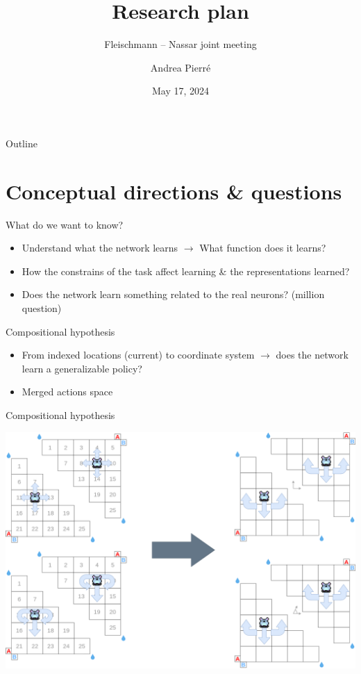 \documentclass[bigger]{beamer}
\author{Andrea Pierré}
\date{May 17, 2024}
\title{Research plan}
\subtitle{Fleischmann -- Nassar joint meeting}
\institute{Brown University}
\begin{document}
\maketitle
\begin{frame}[plain]{Outline}
\tableofcontents
\end{frame}

\section{Conceptual directions \& questions }
\label{sec:orga5c26cb}
\begin{frame}[<+->][label={sec:org422f1d5}]{What do we want to know?}
\begin{itemize}
\item Understand what the network learns
\(\to\) What \alert{function} does it learns?
\item How the constrains of the task affect learning \& the representations learned?
\item Does the network learn something related to the real neurons? (million  question)
\end{itemize}
\end{frame}
\begin{frame}[label={sec:orgf3fe8b7}]{Compositional hypothesis}
\begin{itemize}
\item From indexed locations (current) to coordinate system \(\to\) does the network learn a generalizable policy?
\item Merged actions space
\end{itemize}
\end{frame}
\begin{frame}[label={sec:orgdb095a5}]{Compositional hypothesis}
\begin{center}
\includegraphics[width=.9\linewidth]{img/env_new-triangle-task.drawio.png}
\end{center}
\end{frame}
\end{document}
